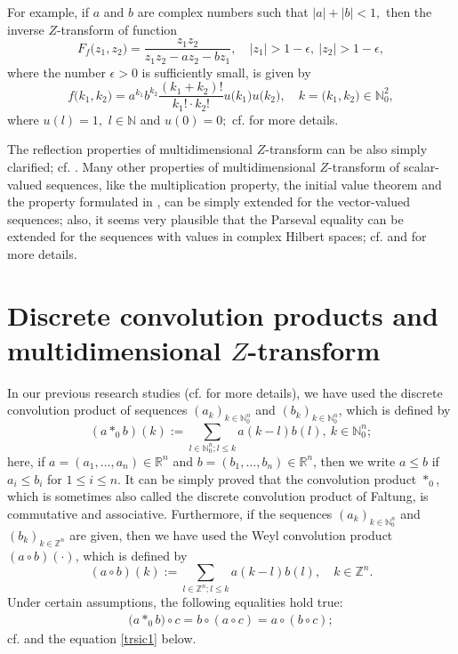 \documentclass{amsart}
\theoremstyle{definition}
\theoremstyle{remark}
\numberwithin{equation}{section}
\begin{document}
For example, if $a$ and $b$ are complex numbers such that $|a|+|b|<1,$ then the inverse $Z$-transform of function
$$
F_{f}\bigl(z_{1},z_{2}\bigr)=\frac{z_{1}z_{2}}{z_{1}z_{2}-az_{2}-bz_{1}},\quad \bigl| z_{1}\bigr|>1-\epsilon,\ \bigl| z_{2}\bigr|>1-\epsilon,
$$
 where the number $\epsilon>0$ is sufficiently small, is given by
$$
f\bigl(k_{1},k_{2}\bigr)=a^{k_{1}}b^{k_{2}}\frac{(k_{1}+k_{2})!}{k_{1}! \cdot k_{2}!}u\bigl(k_{1}\bigr)u\bigl(k_{2}\bigr),\quad k=\bigl(k_{1},k_{2}\bigr)\in {\mathbb N}_{0}^{2},
$$
where $u(l)=1,$ $l\in {\mathbb N}$ and $u(0)=0;$
cf. \cite[pp. 186--187]{dud} for more details.

The reflection properties of multidimensional $Z$-transform can be also simply clarified; cf. \cite[p. 181]{dud}. Many other properties of multidimensional $Z$-transform of scalar-valued sequences, like the
multiplication property, the initial value theorem and the property formulated in \cite[Theorem 2.1.6]{gregor}, can be simply extended for the vector-valued sequences; also, it seems very plausible that the Parseval equality can be extended for the sequences with values in complex Hilbert spaces; cf. \cite[p. 182]{dud} and \cite[Lemma 6.8.1]{gil} for more details.

\section{Discrete convolution products and multidimensional $Z$-transform}\label{disc}

In our previous research studies (cf. \cite{funkcionalne} for more details), we have used the discrete convolution product of sequences $(a_{k})_{k\in {\mathbb N}_{0}^{n}}$ and $(b_{k})_{k\in {\mathbb N}_{0}^{n}}$, which is defined by  
$$
(a\ast_{0}b)(k):=\sum_{l\in {\mathbb N}_{0}^{n};l\leq k}a(k-l)b(l),\ k\in {\mathbb N}_{0}^{n};
$$
here, if $a=(a_{1},...,a_{n})\in {\mathbb R}^{n}$ and $b=(b_{1},...,b_{n})\in {\mathbb R}^{n}$, then we write $a\leq b$ if $a_{i}\leq b_{i}$ for $1\leq i\leq n.$
It can be simply proved that the convolution product $\ast_{0}$, which is sometimes also called the discrete convolution product of Faltung, is commutative and associative. 
Furthermore, if the sequences $(a_{k})_{k\in {\mathbb N}_{0}^{n}}$ and $(b_{k})_{k\in {\mathbb Z}^{n}}$ are given, then we have used the Weyl convolution product $(a\circ b)(\cdot)$, which is defined by
$$
(a\circ b)(k):=\sum_{l\in {\mathbb Z}^{n};l\leq k}a(k-l)b(l),\quad k\in {\mathbb Z}^{n}.
$$
Under certain assumptions, the following equalities hold true:
\begin{align}\label{trsic}
\bigl( a\ast_{0}b\bigr) \circ c =b\circ (a \circ c)=a \circ (b \circ c);
\end{align}
cf. \cite[Theorem 3.12(ii)-(iii)]{keyantuo} and the equation \eqref{trsic1} below.
\end{document}
